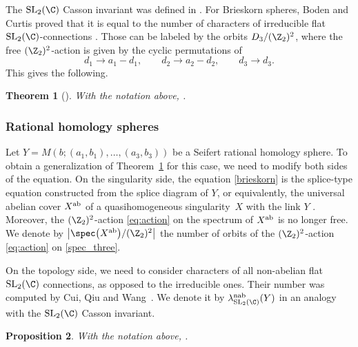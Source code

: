 \documentclass[pdftex]{sigma}
\newtheorem{Theorem}{Theorem}[section]
\newtheorem{Proposition}[Theorem]{Proposition}
\begin{document}
The $\operatorname{SL}_2(\C)$ Casson invariant  was defined in \cite{Cu01}. For Brieskorn spheres, Boden and Curtis proved that it is equal to the number of characters of irreducible flat $\operatorname{SL}_2(\C)$-connections \cite{BC06}. Those can be labeled by the orbits $D_3/(\Z_2)^2$, where the free $(\Z_2)^2$-action is given by the cyclic permutations of
\begin{equation}\label{eq:action}
d_1 \to a_1 - d_1, \qquad d_2 \to a_2 - d_2, \qquad d_3 \to d_3.
\end{equation}
This gives the following.

\begin{Theorem}[{\cite[Theorem~2.4]{BC06}}]\label{CassonMilnor}
With the notation above,
.
\end{Theorem}

\subsubsection{Rational homology spheres}

Let $Y = M(b;(a_1, b_1), \dots, (a_3,b_3))$ be a Seifert rational homology sphere. To obtain a generalization of Theorem~\ref{CassonMilnor} for this case, we need to modify both sides of the equation. On the singularity side, the equation \eqref{brieskorn} is the splice-type equation constructed from the splice diagram of $Y$, or equivalently, the universal abelian cover $X^{\rm ab}$ of a quasihomogeneous singularity~$X$ with the link $Y$ \cite{Neu83}. Moreover, the $(\Z_2)^2$-action \eqref{eq:action} on the spectrum of $X^{\rm ab}$ is no longer free. We denote by $\bigl\lvert\spec\bigl(X^{\rm ab}\bigr)/(\Z_2)^2\bigr\rvert$ the number of orbits of the $(\Z_2)^2$-action \eqref{eq:action} on \eqref{spec_three}.

On the topology side, we need to consider characters of all non-abelian flat $\operatorname{SL}_2(\C)$ connections, as opposed to the irreducible ones. Their number was computed by Cui, Qiu and Wang~\cite{CuQiWa21}. We denote it by $\lambda^{\rm nab}_{\operatorname{SL}_2(\C)}(Y)$ in an analogy with the $\operatorname{SL}_2(\C)$ Casson invariant.

\begin{Proposition}\label{prop:rat_sph_spec}
With the notation above,
.
\end{Proposition}
\end{document}
